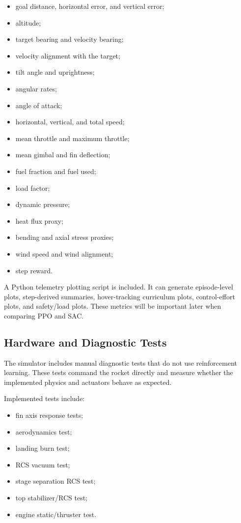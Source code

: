 \documentclass{article}
\begin{document}
\begin{itemize}
    \item goal distance, horizontal error, and vertical error;
    \item altitude;
    \item target bearing and velocity bearing;
    \item velocity alignment with the target;
    \item tilt angle and uprightness;
    \item angular rates;
    \item angle of attack;
    \item horizontal, vertical, and total speed;
    \item mean throttle and maximum throttle;
    \item mean gimbal and fin deflection;
    \item fuel fraction and fuel used;
    \item load factor;
    \item dynamic pressure;
    \item heat flux proxy;
    \item bending and axial stress proxies;
    \item wind speed and wind alignment;
    \item step reward.
\end{itemize}

A Python telemetry plotting script is included. It can generate episode-level plots, step-derived summaries, hover-tracking curriculum plots, control-effort plots, and safety/load plots. These metrics will be important later when comparing PPO and SAC.

\subsection{Hardware and Diagnostic Tests}

The simulator includes manual diagnostic tests that do not use reinforcement learning. These tests command the rocket directly and measure whether the implemented physics and actuators behave as expected.

Implemented tests include:

\begin{itemize}
    \item fin axis response tests;
    \item aerodynamics test;
    \item landing burn test;
    \item RCS vacuum test;
    \item stage separation RCS test;
    \item top stabilizer/RCS test;
    \item engine static/thruster test.
\end{itemize}
\end{document}
